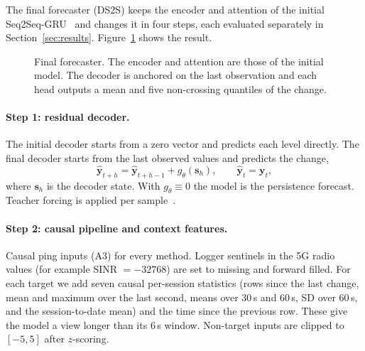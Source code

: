 The final forecaster (DS2S) keeps the encoder and attention of the initial Seq2Seq-GRU~\cite{cho2014learning,bahdanau2015neural} and changes it in four steps, each evaluated separately in Section~\ref{sec:results}. Figure~\ref{fig:arch} shows the result.

\begin{figure}[htbp]
  \centering
  \resizebox{0.8\linewidth}{!}{}
  \caption{Final forecaster. The encoder and attention are those of the initial model. The decoder is anchored on the last observation and each head outputs a mean and five non-crossing quantiles of the change.}
  \label{fig:arch}
\end{figure}

\paragraph{Step 1: residual decoder.} The initial decoder starts from a zero vector and predicts each level directly. The final decoder starts from the last observed values and predicts the change,
\begin{equation}
\hat{\mathbf{y}}_{t+h} = \hat{\mathbf{y}}_{t+h-1} + g_\theta(\mathbf{s}_h), \qquad \hat{\mathbf{y}}_{t} = \mathbf{y}_t ,
\label{eq:resid}
\end{equation}
where $\mathbf{s}_h$ is the decoder state. With $g_\theta\equiv 0$ the model is the persistence forecast. Teacher forcing is applied per sample~\cite{bengio2015scheduled}.

\paragraph{Step 2: causal pipeline and context features.} Causal ping inputs (A3) for every method. Logger sentinels in the 5G radio values (for example SINR $=-32768$) are set to missing and forward filled. For each target we add seven causal per-session statistics (rows since the last change, mean and maximum over the last second, means over 30\,s and 60\,s, SD over 60\,s, and the session-to-date mean) and the time since the previous row. These give the model a view longer than its 6\,s window. Non-target inputs are clipped to $[-5,5]$ after $z$-scoring.

